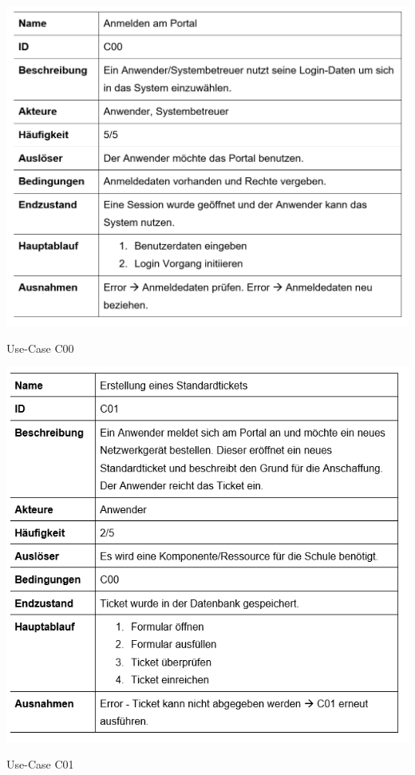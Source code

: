 \vspace{-.5cm}
\begin{table}[h]
	\centering
	\includegraphics[scale=0.51]{figures/C00.png}
	\caption{Use-Case C00}
	\label{Abb_C00}
\end{table}
\newpage
\vspace{-.5cm}	
\begin{table}[h]
	\centering
	\includegraphics[scale=0.55]{figures/C01.png}
	\caption{Use-Case C01}
	\label{Abb_C01}
\end{table}
